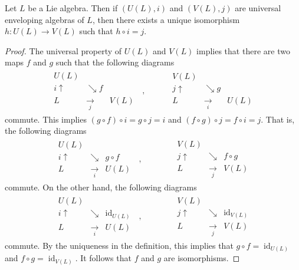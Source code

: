 \documentclass[10pt,a4paper]{amsart}
\DeclareMathOperator{\id}{id}
\begin{document}
\begin{Theorem}\label{universalenvelopingalgebraunique}
Let $L$ be a Lie algebra. Then if $(U(L), i)$ and $(V(L), j)$ are universal enveloping algebras of $L$, then there exists a unique isomorphism $h: U(L) \rightarrow V(L)$ such that $h\circ i=j$.
\end{Theorem}

\begin{proof}
The universal property of $U(L)$ and $V(L)$ implies that there are two maps $f$ and $g$ such that the following diagrams
\begin{align*}
\begin{matrix}
U(L) && \\
i \uparrow &\searrow f &\\
L & \xrightarrow[j]{} & V(L)
\end{matrix}\;\;,
\quad&\quad
\begin{matrix}
V(L) && \\
j \uparrow &\searrow g &\\
L & \xrightarrow[i]{} & U(L)
\end{matrix}
\end{align*}
commute. This implies $(g\circ f)\circ i = g\circ j =i$ and $(f\circ g)\circ j=f\circ i=j$. That is, the following diagrams
\begin{align*}
\begin{matrix}
U(L) && \\
i \uparrow &\searrow &g\circ f \\
L & \xrightarrow[i]{} & U(L)
\end{matrix}\;\;,
\quad\quad&\quad
\begin{matrix}
V(L) && \\
j \uparrow &\searrow &f\circ g \\
L & \xrightarrow[j]{} & V(L)
\end{matrix}
\end{align*}
commute. On the other hand, the following diagrams
\begin{align*}
\begin{matrix}
U(L) && \\
i \uparrow &\searrow &\id_{U(L)} \\
L & \xrightarrow[i]{} & U(L)
\end{matrix}\;\;,
\quad\quad&\quad
\begin{matrix}
V(L) && \\
j \uparrow &\searrow &\id_{V(L)} \\
L & \xrightarrow[j]{} & V(L)
\end{matrix}
\end{align*}
commute. By the uniqueness in the definition, this implies that $g\circ f=\id_{U(L)}$ and $f\circ g=\id_{V(L)}$. It follows that $f$ and $g$ are isomorphisms.
\end{proof}
\end{document}
